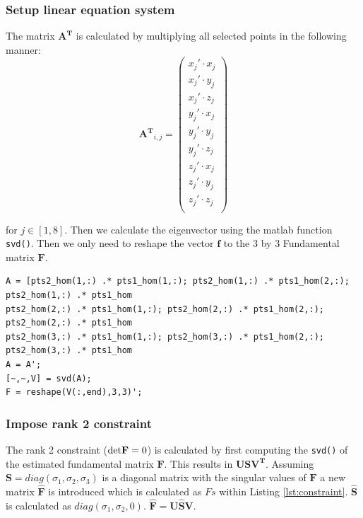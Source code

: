 \documentclass[
a4paper,     %
11pt         %
]{scrartcl}  %
\begin{document}
\subsubsection{Setup linear equation system}

The matrix $\mathbf{A^T}$ is calculated by multiplying all selected points in the following manner:
$$
\mathbf{A^T}_{i,j} = \left(\begin{array}{lll}
x_j' \cdot x_j \\ x_j' \cdot y_j \\ x_j' \cdot z_j\\
y_j' \cdot x_j \\ y_j' \cdot y_j \\ y_j' \cdot z_j\\
z_j' \cdot x_j \\ z_j' \cdot y_j \\ z_j' \cdot z_j\\
\end{array}\right)
$$

for $j \in [1,8]$. Then we calculate the eigenvector using the matlab function \lstinline{svd()}.
Then we only need to reshape the vector $\mathbf{f}$ to the $3$ by $3$ Fundamental matrix $\mathbf{F}$.

\begin{lstlisting}[label=lst:setup, caption=Matlab script setting up linear equation system]
A = [pts2_hom(1,:) .* pts1_hom(1,:); pts2_hom(1,:) .* pts1_hom(2,:); pts2_hom(1,:) .* pts1_hom
pts2_hom(2,:) .* pts1_hom(1,:); pts2_hom(2,:) .* pts1_hom(2,:); pts2_hom(2,:) .* pts1_hom
pts2_hom(3,:) .* pts1_hom(1,:); pts2_hom(3,:) .* pts1_hom(2,:); pts2_hom(3,:) .* pts1_hom
A = A';
[~,~,V] = svd(A);
F = reshape(V(:,end),3,3)';
\end{lstlisting}

\subsubsection{Impose rank 2 constraint}

The rank 2 constraint ($\textmd{det} \mathbf{F} = 0$) is calculated by first computing the \lstinline{svd()} of the estimated fundamental matrix $\mathbf{F}$.
This results in $\mathbf{USV^T}$. Assuming $\mathbf{S} = diag(\sigma_1, \sigma_2, \sigma_3)$ is a diagonal matrix with the singular values of $\mathbf{F}$ a new matrix
$\mathbf{\hat{F}}$ is introduced which is calculated as $Fs$ within Listing \ref{lst:constraint}.
$\mathbf{\hat{S}}$ is calculated as $diag(\sigma_1, \sigma_2, 0)$. $\mathbf{\hat{F}} = \mathbf{U\hat{S}V}$.
\end{document}

